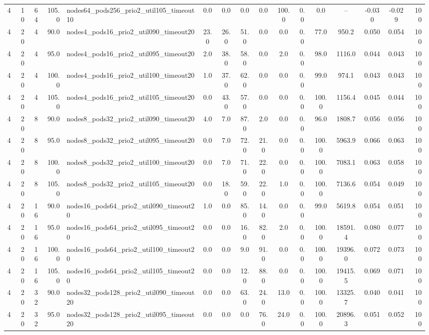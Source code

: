 \begin{tabular}{r r r r l c c c c c c c c c c r}
4 & 10 & 64 & 105.0 & nodes64\_pods256\_prio2\_util105\_timeout10 & 0.0 & 0.0 & 0.0 & 0.0 & 100.0 & 0.0 & 0.0 & -- & -0.030 & -0.029 & 100 \\
4 & 20 & 4 & 90.0 & nodes4\_pods16\_prio2\_util090\_timeout20 & 23.0 & 26.0 & 51.0 & 0.0 & 0.0 & 0.0 & 77.0 & 950.2 & 0.050 & 0.054 & 100 \\
4 & 20 & 4 & 95.0 & nodes4\_pods16\_prio2\_util095\_timeout20 & 2.0 & 38.0 & 58.0 & 0.0 & 2.0 & 0.0 & 98.0 & 1116.0 & 0.044 & 0.043 & 100 \\
4 & 20 & 4 & 100.0 & nodes4\_pods16\_prio2\_util100\_timeout20 & 1.0 & 37.0 & 62.0 & 0.0 & 0.0 & 0.0 & 99.0 & 974.1 & 0.043 & 0.043 & 100 \\
4 & 20 & 4 & 105.0 & nodes4\_pods16\_prio2\_util105\_timeout20 & 0.0 & 43.0 & 57.0 & 0.0 & 0.0 & 0.0 & 100.0 & 1156.4 & 0.045 & 0.044 & 100 \\
4 & 20 & 8 & 90.0 & nodes8\_pods32\_prio2\_util090\_timeout20 & 4.0 & 7.0 & 87.0 & 2.0 & 0.0 & 0.0 & 96.0 & 1808.7 & 0.056 & 0.056 & 100 \\
4 & 20 & 8 & 95.0 & nodes8\_pods32\_prio2\_util095\_timeout20 & 0.0 & 7.0 & 72.0 & 21.0 & 0.0 & 0.0 & 100.0 & 5963.9 & 0.066 & 0.063 & 100 \\
4 & 20 & 8 & 100.0 & nodes8\_pods32\_prio2\_util100\_timeout20 & 0.0 & 7.0 & 71.0 & 22.0 & 0.0 & 0.0 & 100.0 & 7083.1 & 0.063 & 0.058 & 100 \\
4 & 20 & 8 & 105.0 & nodes8\_pods32\_prio2\_util105\_timeout20 & 0.0 & 18.0 & 59.0 & 22.0 & 1.0 & 0.0 & 100.0 & 7136.6 & 0.054 & 0.049 & 100 \\
4 & 20 & 16 & 90.0 & nodes16\_pods64\_prio2\_util090\_timeout20 & 1.0 & 0.0 & 85.0 & 14.0 & 0.0 & 0.0 & 99.0 & 5619.8 & 0.054 & 0.051 & 100 \\
4 & 20 & 16 & 95.0 & nodes16\_pods64\_prio2\_util095\_timeout20 & 0.0 & 0.0 & 16.0 & 82.0 & 2.0 & 0.0 & 100.0 & 18591.4 & 0.080 & 0.077 & 100 \\
4 & 20 & 16 & 100.0 & nodes16\_pods64\_prio2\_util100\_timeout20 & 0.0 & 0.0 & 9.0 & 91.0 & 0.0 & 0.0 & 100.0 & 19396.0 & 0.072 & 0.073 & 100 \\
4 & 20 & 16 & 105.0 & nodes16\_pods64\_prio2\_util105\_timeout20 & 0.0 & 0.0 & 12.0 & 88.0 & 0.0 & 0.0 & 100.0 & 19415.5 & 0.069 & 0.071 & 100 \\
4 & 20 & 32 & 90.0 & nodes32\_pods128\_prio2\_util090\_timeout20 & 0.0 & 0.0 & 63.0 & 24.0 & 13.0 & 0.0 & 100.0 & 13325.7 & 0.040 & 0.041 & 100 \\
4 & 20 & 32 & 95.0 & nodes32\_pods128\_prio2\_util095\_timeout20 & 0.0 & 0.0 & 0.0 & 76.0 & 24.0 & 0.0 & 100.0 & 20896.3 & 0.051 & 0.052 & 100 \\

\end{tabular}
